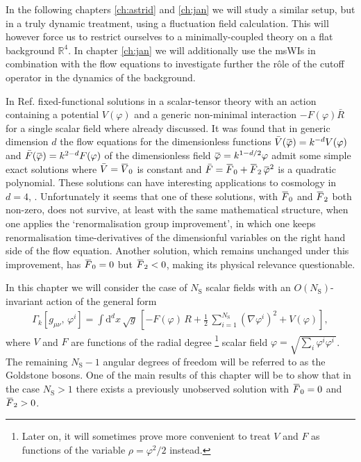 \documentclass[11pt]{book}
\newcommand{\overbar}[1]{\mkern 1.5mu\overline{\mkern-1.5mu#1\mkern-1.5mu}\mkern 1.5mu}
\newcommand\gmunu{ g_{\mu\nu} }
\newcommand\NS{ N_{\scriptscriptstyle{\mathrm{S}}} }
\newcommand{\bV}{\overbar V}
\newcommand{\bF}{\overbar F}
\newcommand{\bp}{\overbar \varphi}
\numberwithin{equation}{chapter}
\begin{document}
In the following chapters \ref{ch:astrid} and \ref{ch:jan} we will study a similar setup,
but in a truly dynamic treatment, using a fluctuation field calculation.
This will however force us to restrict ourselves to a minimally-coupled theory
on a flat background $\mathbb R^4$.
In chapter \ref{ch:jan} we will additionally use the msWIs in combination with
the flow equations to investigate further the r\^ole of the cutoff operator
in the dynamics of the background.

In Ref. \cite{Percacci:2015wwa} fixed-functional solutions
in a scalar-tensor theory with an action containing a potential $V(\varphi)$
and a generic non-minimal interaction $-F(\varphi) \bar R$ for a single scalar field
where already discussed.
It was found that in generic dimension $d$ the flow equations for the dimensionless
functions $\bar V(\bp)= k^{-d} V(\varphi)$ and $\bar F(\bp)=k^{2-d}F(\varphi)$
of the dimensionless field $\bp = k^{1-d/2} \varphi$
admit some simple exact solutions where $\bar V = \bV_0$ is constant and
$\bar F = \bF_0 + \bF_2 \, \bp^2$ is a quadratic polynomial.
These solutions can have interesting applications to cosmology in $d=4$,
\cite{Henz:2013oxa}.
Unfortunately it seems that one of these solutions,
with $\bF_0$ and $\bF_2$ both non-zero, does not survive,
at least with the same mathematical structure,
when one applies the `renormalisation group improvement',
in which one keeps renormalisation time-derivatives of the dimensionful
variables on the right hand side of the flow equation.
Another solution, which remains unchanged under this improvement,
has $\bF_0=0$ but $\bF_2<0$, making its physical relevance questionable.

In this chapter we will consider the case of $\NS$ scalar fields with
an $O(\NS)$-invariant action of the general form
\begin{align}
  \Gamma_k [\gmunu, \, \varphi^i] =
  \int \mathrm d^dx \, \sqrt{g} \,
  \left[ - F(\varphi) \, R + \frac{1}{2} \, \sum_{i=1}^{\NS} \left( \nabla\varphi^i \right)^2 + V(\varphi)  \right] ,
  \label{action}
\end{align}
where $V$ and $F$ are functions of the radial degree%
\footnote{
Later on, it will sometimes prove more convenient to treat
$V$ and $F$ as functions of the variable $\rho=\varphi^2/2$ instead.
} scalar field
$\varphi=\sqrt{\sum_i \varphi^i \varphi^i \,}$.
The remaining $\NS-1$ angular degrees of freedom will be referred to as the Goldstone bosons.
One of the main results of this chapter will be to show that in the case
$\NS>1$ there exists a previously unobserved solution with $\bF_0=0$ and $\bF_2>0$.
\end{document}
